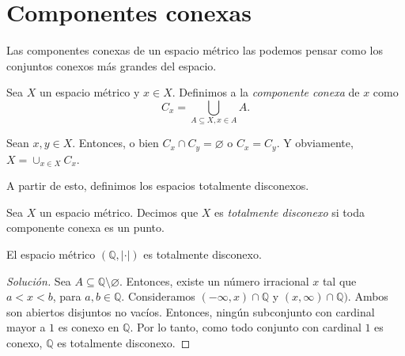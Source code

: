 \section{Componentes conexas}

Las componentes conexas de un espacio métrico las podemos pensar como los conjuntos conexos más grandes del espacio.

\begin{definition}
	Sea $X$ un espacio métrico y $x \in X$. Definimos a la \emph{componente conexa} de $x$ como
	\begin{equation*}
		C_x = \bigcup_{A \subseteq X, x \in A} A.
	\end{equation*}
\end{definition}

\begin{remark}
	Sean $x, y \in X$. Entonces, o bien $C_x \cap C_y = \varnothing$ o $C_x = C_y$. Y obviamente, $X = \cup_{x \in X} C_x$.
\end{remark}

A partir de esto, definimos los espacios totalmente disconexos.

\begin{definition}
	Sea $X$ un espacio métrico. Decimos que $X$ es \emph{totalmente disconexo} si toda componente conexa es un punto.
\end{definition}

\begin{example}
	El espacio métrico $(\mathbb{Q}, |\cdot|)$ es totalmente disconexo.
\end{example}

\begin{proof}[Solución]
	Sea $A \subseteq \mathbb{Q} \setminus \varnothing$. Entonces, existe un número irracional $x$ tal que $a < x < b$, para $a, b \in \mathbb{Q}$. Consideramos $(-\infty, x) \cap \mathbb{Q}$ y $(x, \infty) \cap \mathbb{Q})$. Ambos son abiertos disjuntos no vacíos. Entonces, ningún subconjunto con cardinal mayor a $1$ es conexo en $\mathbb{Q}$. Por lo tanto, como todo conjunto con cardinal $1$ es conexo, $\mathbb{Q}$ es totalmente disconexo.
\end{proof}










